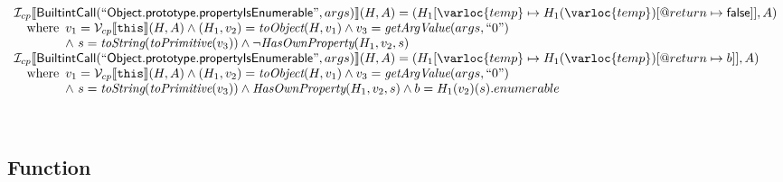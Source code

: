 \[\begin{array}{l}
\I _{cp}\lbr \SF{BuiltintCall}(``\SF{Object.prototype.propertyIsEnumerable}",args)\rbr(H,A)
 = (H_1[\varloc{temp}\mapsto H_1(\varloc{temp})[\varprop{return}\mapsto \SF{false}]], A) \\
\quad\wherec{
  v_1 = \V _{cp}\lbr \TT{this}\rbr (H,A) \land (H_1, v_2) = \hf{toObject}(H, v_1)
  \land v_3 =  \hf{getArgValue}(args, ``0")\\
  \land\ s = \hf{toString}(\hf{toPrimitive}(v_3)) \land \neg \hf{HasOwnProperty}(H_1, v_2, s)
  }\\
  
\I _{cp}\lbr \SF{BuiltintCall}(``\SF{Object.prototype.propertyIsEnumerable}",args)\rbr(H,A)
 = (H_1[\varloc{temp}\mapsto H_1(\varloc{temp})[\varprop{return}\mapsto b]], A) \\
\quad\wherec{
  v_1 = \V _{cp}\lbr \TT{this}\rbr (H,A) \land (H_1, v_2) = \hf{toObject}(H, v_1)
  \land v_3 =  \hf{getArgValue}(args, ``0")\\
  \land\ s = \hf{toString}(\hf{toPrimitive}(v_3)) \land \hf{HasOwnProperty}(H_1, v_2, s)
  \land b = H_1(v_2)(s).enumerable
  }\\
\\\\

\end{array}
\]


\subsection{Function}

